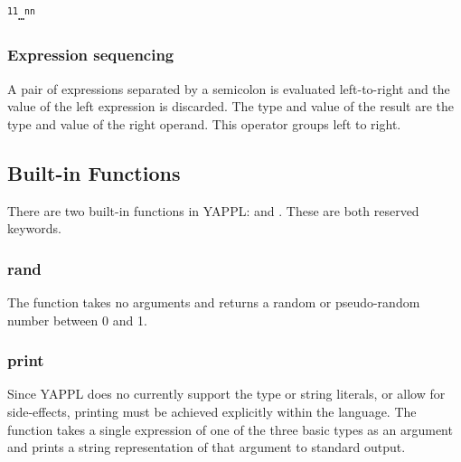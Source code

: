 \begin{alltt}
\quad {}   \textsuperscript{1} \term{->} \textsuperscript{1} \term{|} \dots \term{|} \textsuperscript{n} \term{->} \textsuperscript{n}
\end{alltt}

\subsubsection{Expression sequencing}
A pair of expressions separated by a semicolon is evaluated left-to-right and the value of the left expression is discarded. The type and value of the result are the type and value of the right operand. This operator groups left to right.
\begin{alltt}
\quad {} \term{;} 
\end{alltt}

\subsection{Built-in Functions}
There are two built-in functions in YAPPL:  and . These are both reserved keywords. 
\subsubsection{rand}
The function  takes no arguments and returns a random or pseudo-random number between 0 and 1. 

\subsubsection{print}
Since YAPPL does no currently support the  type or string literals, or allow for side-effects, printing must be achieved explicitly within the language. The  function takes a single expression of one of the three basic types as an argument and prints a string representation of that argument to standard output. 


